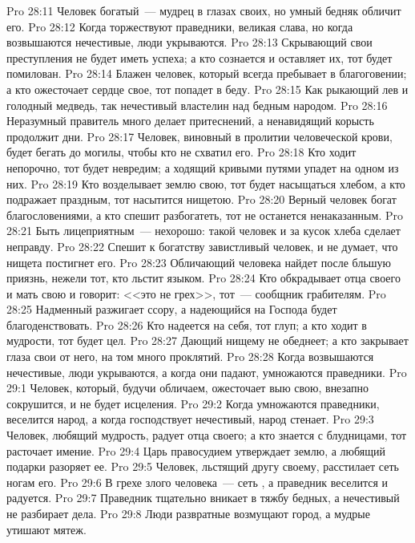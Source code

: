 \vs Pro 28:11 Человек богатый~--- мудрец в глазах своих, но умный бедняк обличит его.
\vs Pro 28:12 Когда торжествуют праведники, великая слава, но когда возвышаются нечестивые, люди укрываются.
\vs Pro 28:13 Скрывающий свои преступления не будет иметь успеха; а кто сознается и оставляет их, тот будет помилован.
\rsbpar\vs Pro 28:14 Блажен человек, который всегда пребывает в благоговении; а кто ожесточает сердце свое, тот попадет в беду.
\vs Pro 28:15 Как рыкающий лев и голодный медведь, так нечестивый властелин над бедным народом.
\vs Pro 28:16 Неразумный правитель много делает притеснений, а ненавидящий корысть продолжит дни.
\vs Pro 28:17 Человек, виновный в пролитии человеческой крови, будет бегать до могилы, чтобы кто не схватил его.
\vs Pro 28:18 Кто ходит непорочно, тот будет невредим; а ходящий кривыми путями упадет на одном из них.
\vs Pro 28:19 Кто возделывает землю свою, тот будет насыщаться хлебом, а кто подражает праздным, тот насытится нищетою.
\vs Pro 28:20 Верный человек богат благословениями, а кто спешит разбогатеть, тот не останется ненаказанным.
\vs Pro 28:21 Быть лицеприятным~--- нехорошо: такой человек и за кусок хлеба сделает неправду.
\vs Pro 28:22 Спешит к богатству завистливый человек, и не думает, что нищета постигнет его.
\vs Pro 28:23 Обличающий человека найдет после бльшую приязнь, нежели тот, кто льстит языком.
\vs Pro 28:24 Кто обкрадывает отца своего и мать свою и говорит: <<это не грех>>, тот~--- сообщник грабителям.
\vs Pro 28:25 Надменный разжигает ссору, а надеющийся на Господа будет благоденствовать.
\vs Pro 28:26 Кто надеется на себя, тот глуп; а кто ходит в мудрости, тот будет цел.
\vs Pro 28:27 Дающий нищему не обеднеет; а кто закрывает глаза свои от него, на том много проклятий.
\vs Pro 28:28 Когда возвышаются нечестивые, люди укрываются, а когда они падают, умножаются праведники.
\vs Pro 29:1 Человек, который, будучи обличаем, ожесточает выю свою, внезапно сокрушится, и не будет  исцеления.
\vs Pro 29:2 Когда умножаются праведники, веселится народ, а когда господствует нечестивый, народ стенает.
\vs Pro 29:3 Человек, любящий мудрость, радует отца своего; а кто знается с блудницами, тот расточает имение.
\vs Pro 29:4 Царь правосудием утверждает землю, а любящий подарки разоряет ее.
\vs Pro 29:5 Человек, льстящий другу своему, расстилает сеть ногам его.
\vs Pro 29:6 В грехе злого человека~--- сеть , а праведник веселится и радуется.
\vs Pro 29:7 Праведник тщательно вникает в тяжбу бедных, а нечестивый не разбирает дела.
\vs Pro 29:8 Люди развратные возмущают город, а мудрые утишают мятеж.

